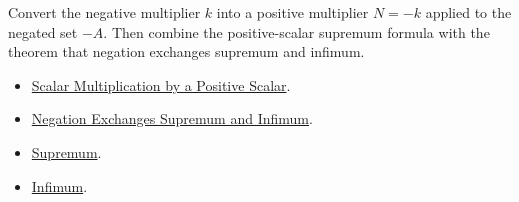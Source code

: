 \begin{remark*}
Convert the negative multiplier $k$ into a positive multiplier $N=-k$ applied
to the negated set $-A$. Then combine the positive-scalar supremum formula
with the theorem that negation exchanges supremum and infimum.
\end{remark*}

\begin{dependencies}
\begin{itemize}
  \item \hyperref[thm:scalar-mult-positive]{Scalar Multiplication by a Positive Scalar}.
  \item \hyperref[thm:negation-exchange-sup-inf]{Negation Exchanges Supremum and Infimum}.
  \item \hyperref[def:supremum]{Supremum}.
  \item \hyperref[def:infimum]{Infimum}.
\end{itemize}
\end{dependencies}

\clearpage

